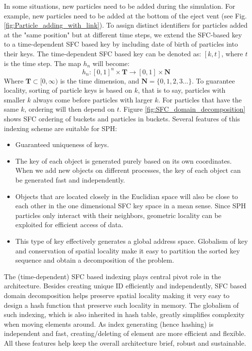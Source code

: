 In some situations, new particles need to be added during the simulation. For example, new particles need to be added at the bottom of the eject vent (see Fig. \ref{fig:Particle_adding_with_link}). To assign distinct identifiers for particles added at the "same position" but at different time steps, we extend the SFC-based key to a time-dependent SFC based key by including date of birth of particles into their keys. The time-dependent SFC based key can be denoted as: $[k,t]$, where $t$ is the time step. The map $h_n$ will become:
\begin{equation}
h_n: [0,1]^n \times \textbf{T} \rightarrow [0,1] \times \textbf{N}
\end{equation}
Where $\textbf{T} \subset [0,\infty)$ is the time dimension, and $\textbf{N}=\lbrace 0, 1, 2, 3...\rbrace$.
To guarantee locality, sorting of particle keys is based on $k$, that is to say, particles with smaller $k$ always come before particles with larger $k$. For particles that have the same $k$, ordering will then depend on $t$. Figure \ref{fig:SFC_domain_decomposition} shows SFC ordering of buckets and particles in buckets. 
Several features of this indexing scheme are suitable for SPH:
\begin{itemize}
\item Guaranteed uniqueness of keys.
\item The key of each object is generated purely based on its own coordinates. When we add new objects on different processes, the key of each object can be generated fast and independently.
\item Objects that are located closely in the Euclidian space will also be close to each other in the one dimensional SFC key space in a mean sense. Since SPH particles only interact with their neighbors, geometric locality can be exploited for efficient access of data.
\item This type of key effectively generates a global address space. Globalism of key and conservation of spatial locality make it easy to partition the sorted key sequence and obtain a decomposition of the problem.
\end{itemize}

The (time-dependent) SFC based indexing plays central pivot role in the architecture. Besides creating unique ID efficiently and independently, SFC based domain decomposition helps preserve spatial locality making it very easy to design a hash function that preserve such locality in memory. The globalism of such indexing, which is also inherited in hash table, greatly simplifies complexity when moving elements around. As index generating (hence hashing) is independent and fast, creating/deleting of element are more efficient and flexible.
All these features help keep the overall architecture brief, robust and sustainable.

